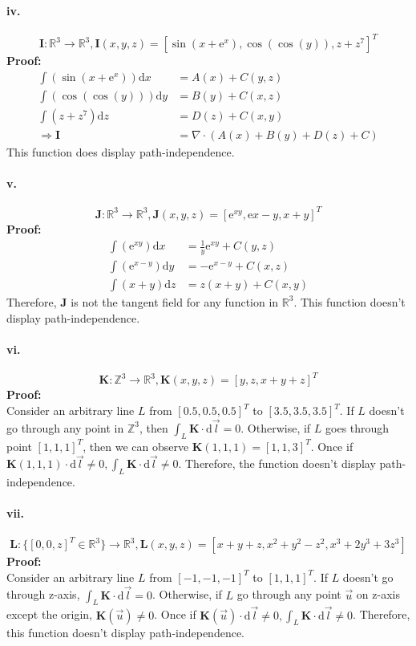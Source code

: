 \documentclass[11pt, a4paper]{article}
\begin{document}
\paragraph{iv.}
$$\bm{I}: \mathbb{R}^3 \to \mathbb{R}^3, \bm{I}(x, y, z) = [\sin(x+\mathrm{e}^x), \cos(\cos(y)), z + z^7]^T$$
\textbf{Proof:}
$$\begin{aligned}
    \int (\sin(x+\mathrm{e}^x))\mathrm{d}x &= A(x)+C(y,z) \\
    \int (\cos(\cos(y)))\mathrm{d}y &= B(y)+C(x, z) \\
    \int (z + z^7)\mathrm{d}z &= D(z)+C(x, y) \\
    \Rightarrow \bm{I} &= \nabla \cdot (A(x)+B(y)+D(z)+C)
\end{aligned}$$
This function does display
path-independence.

\paragraph{v.}
$$\bm{J}: \mathbb{R}^3 \to \mathbb{R}^3, \bm{J}(x, y, z) = [\mathrm{e}^{xy}, \mathrm{e}{x-y}, x+y]^T$$
\textbf{Proof:}
$$\begin{aligned}
    \int (\mathrm{e}^{xy})\mathrm{d}x &= \frac{1}{y}\mathrm{e}^{xy} +C(y, z) \\
    \int (\mathrm{e}^{x-y})\mathrm{d}y &= -\mathrm{e}^{x-y}+C(x, z) \\
    \int (x+y)\mathrm{d}z &= z(x+y)+C(x, y)
\end{aligned}$$
Therefore, $\bm{J}$ is not the tangent field for any function in $\mathbb{R}^3$. This function doesn't display
path-independence.

\paragraph{vi.}
$$\bm{K}: \mathbb{Z}^3 \to \mathbb{R}^3, \bm{K}(x, y, z) = [y, z, x+y+z]^T$$
\textbf{Proof:} \\
Consider an arbitrary line $L$ from $[0.5, 0.5, 0.5]^T$ to $[3.5, 3.5, 3.5]^T$. If $L$ doesn't go through any point in $\mathbb{Z}^3$, then $\int_L \bm{K} \cdot \mathrm{d}\vec{l} = 0$. Otherwise, if $L$ goes through point $[1, 1, 1]^T$, then we can observe $\bm{K}(1, 1, 1) = [1, 1, 3]^T$. Once if $\bm{K}(1, 1, 1) \cdot \mathrm{d}\vec{l} \neq 0, \int_L \bm{K} \cdot \mathrm{d}\vec{l} \neq 0$. Therefore, the function doesn't display path-independence.
\paragraph{vii.}
$$\bm{L}:\{[0,0,z]^T \in \mathbb{R}^3\} \to \mathbb{R}^3, \bm{L}(x, y, z) = [x+y+z, x^2+y^2-z^2, x^3+2y^3+3z^3]$$
\textbf{Proof:} \\
Consider an arbitrary line $L$ from $[-1, -1, -1]^T$ to $[1, 1, 1]^T$. If $L$ doesn't go through z-axis, $\int_L \bm{K} \cdot \mathrm{d}\vec{l} = 0$. Otherwise, if $L$ go through any point $\vec{u}$ on z-axis except the origin, $\bm{K}(\vec{u}) \neq 0$. Once if $\bm{K}(\vec{u})\cdot \mathrm{d}\vec{l} \neq 0, \int_L\bm{K} \cdot \mathrm{d}\vec{l} \neq 0$. Therefore, this function doesn't display path-independence.
\end{document}
